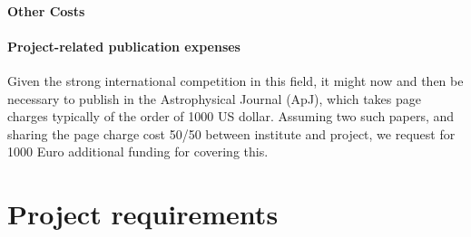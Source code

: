 \documentclass[10pt,fleqn,twoside]{article}
\begin{document}
\paragraph{Other Costs}

\paragraph{Project-related publication expenses}
Given the strong international competition in this field, it might now
and then be necessary to publish in the Astrophysical Journal (ApJ),
which takes page charges typically of the order of 1000 US dollar. 
Assuming two such papers, and sharing the page charge cost 50/50 
between institute and project, we request for 1000 Euro additional
funding for covering this.


% 
% 
% 
% 
% 
% 
% 
% 
% 
% 
% 
% 

\section{Project requirements}
\renewcommand{\leftmark}{\sc Project requirements}
\end{document}
